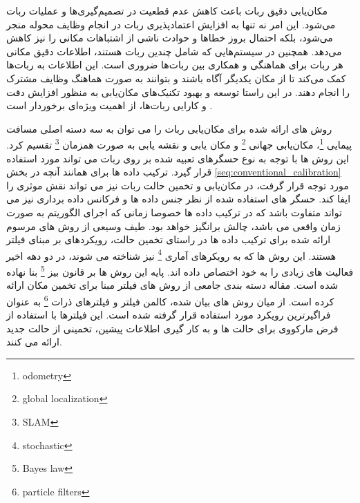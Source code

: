 مکان‌یابی دقیق ربات باعث کاهش عدم قطعیت در تصمیم‌گیری‌ها و عملیات ربات می‌شود. این امر نه تنها به افزایش اعتمادپذیری ربات در انجام وظایف محوله منجر می‌شود، بلکه احتمال بروز خطاها و حوادث ناشی از اشتباهات مکانی را نیز کاهش می‌دهد. همچنین در سیستم‌هایی که شامل چندین ربات هستند، اطلاعات دقیق مکانی هر ربات برای هماهنگی و همکاری بین ربات‌ها ضروری است. این اطلاعات به ربات‌ها کمک می‌کند تا از مکان یکدیگر آگاه باشند و بتوانند به صورت هماهنگ وظایف مشترک را انجام دهند. در این راستا توسعه و بهبود تکنیک‌های مکان‌یابی به منظور افزایش دقت و کارایی ربات‌ها، از اهمیت ویژه‌ای برخوردار است
\cite{aragues2011multi}.


روش های ارائه شده برای مکان‌یابی ربات را می توان به سه دسته اصلی مسافت پیمایی
\footnote{odometry}،
مکان‌یابی جهانی
\footnote{global localization}
و مکان یابی و نقشه یابی به صورت همزمان
\footnote{SLAM}
تقسیم کرد. این روش ها با توجه به نوع حسگرهای تعبیه شده بر روی ربات می تواند مورد استفاده قرار گیرد. ترکیب داده ها برای همانند آنچه در بخش
\ref{seq:conventional_calibration}
مورد توجه قرار گرفت، در مکان‌یابی و تخمین حالت ربات نیز می تواند نقش موثری را ایفا کند. حسگر های استفاده شده از نظر جنس داده ها و فرکانس داده برداری نیز می تواند متفاوت باشد که در ترکیب داده ها خصوصا زمانی که اجرای الگوریتم به صورت زمان واقعی می باشد، چالش برانگیز خواهد بود. طیف وسیعی از روش های مرسوم ارائه شده برای ترکیب داده ها در راستای تخمین حالت، رویکردهای بر مبنای فیلتر هستند. این روش ها که به رویکرهای آماری 
\footnote{stochastic}
نیز شناخته می شوند، در دو دهه اخیر فعالیت های زیادی را به خود اختصاص داده اند. پایه این روش ها بر قانون بیز
\footnote{Bayes law}
بنا نهاده شده است. مقاله
\cite{panigrahi2022localization} 
دسته بندی جامعی از روش های فیلتر مبنا برای تخمین مکان ارائه کرده است. از میان روش های بیان شده، کالمن فیلتر و فیلترهای ذرات
\footnote{particle filters}
به عنوان فراگیرترین رویکرد مورد استفاده قرار گرفته شده است. این فیلترها با استفاده از فرض مارکووی برای حالت ها و به کار گیری اطلاعات پیشین، تخمینی از حالت جدید ارائه می کنند. 

